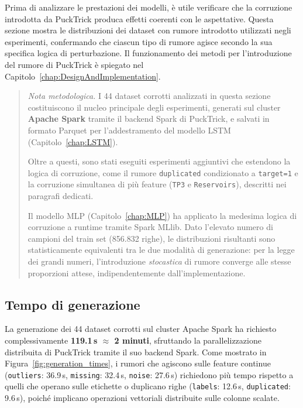 \documentclass[../main.tex]{subfiles}
\begin{document}
Prima di analizzare le prestazioni dei modelli, è utile verificare che la corruzione introdotta da PuckTrick produca effetti coerenti con le aspettative. Questa sezione mostra le distribuzioni dei dataset con rumore introdotto utilizzati negli esperimenti, confermando che ciascun tipo di rumore agisce secondo la sua specifica logica di perturbazione. Il funzionamento dei metodi per l'introduzione del rumore di PuckTrick è spiegato nel Capitolo~\ref{chap:DesignAndImplementation}.


\begin{quote}
\textit{Nota metodologica.}
I 44 dataset corrotti analizzati in questa sezione costituiscono il nucleo principale degli esperimenti, generati sul cluster \textbf{Apache Spark} tramite il backend Spark di PuckTrick, e salvati in formato Parquet per l'addestramento del modello LSTM (Capitolo~\ref{chap:LSTM}).

Oltre a questi, sono stati eseguiti esperimenti aggiuntivi che estendono la logica di corruzione, come il rumore \texttt{duplicated} condizionato a \texttt{target=1} e la corruzione simultanea di più feature (\texttt{TP3} e \texttt{Reservoirs}), descritti nei paragrafi dedicati.

Il modello MLP (Capitolo~\ref{chap:MLP}) ha applicato la medesima logica di corruzione a runtime tramite Spark MLlib. Dato l'elevato numero di campioni del train set (856.832 righe), le distribuzioni risultanti sono statisticamente equivalenti tra le due modalità di generazione: per la legge dei grandi numeri, l'introduzione \textit{stocastica} di rumore converge alle stesse proporzioni attese, indipendentemente dall'implementazione.
\end{quote}


\subsection{Tempo di generazione}
\label{subsec:tempo_generazione}

La generazione dei 44 dataset corrotti sul cluster Apache Spark ha richiesto complessivamente \textbf{119.1\,s $\approx$ 2 minuti}, sfruttando la parallelizzazione distribuita di PuckTrick tramite il suo backend Spark. Come mostrato in Figura~\ref{fig:generation_times}, i rumori che agiscono sulle feature continue (\texttt{outliers}: 36.9\,s, \texttt{missing}: 32.4\,s, \texttt{noise}: 27.6\,s) richiedono più tempo rispetto a quelli che operano sulle etichette o duplicano righe (\texttt{labels}: 12.6\,s, \texttt{duplicated}: 9.6\,s), poiché implicano operazioni vettoriali distribuite sulle colonne scalate. %
\end{document}
